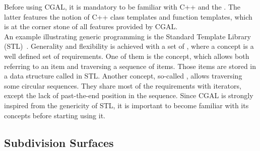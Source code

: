 
Before using CGAL, it is mandatory to be familiar with C++ and the
. The latter features the notion
of C++ class templates and function templates, which is at the corner
stone of all features provided by CGAL.\\


An example illustrating generic programming is the Standard Template
Library (STL)~\cite{ms-stl-96}. Generality and flexibility is achieved
with a set of , where a concept is a well defined set
of requirements. One of them is the  concept, which
allows both referring to an item and traversing a sequence of
items. Those items are stored in a data structure called
 in STL. Another concept, so-called
, allows traversing some circular sequences. They
share most of the requirements with iterators, except the lack of
past-the-end position in the sequence. Since CGAL is strongly inspired
from the genericity of STL, it is important to become familiar with
its concepts before starting using it.

\subsection{Subdivision Surfaces}


